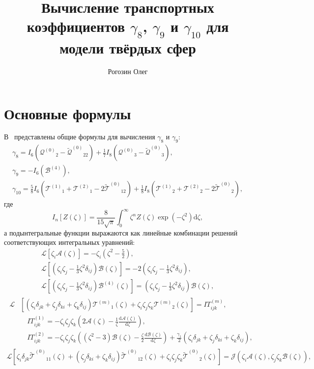 \documentclass[a4paper,12pt]{article}
\title{Вычисление транспортных коэффициентов \(\gamma_8\), \(\gamma_9\) и \(\gamma_{10}\) для модели твёрдых сфер}
\author{Рогозин Олег}
\newcommand{\dd}{\mathrm{d}}
\newcommand{\der}[2][]{\frac{\dd#1}{\dd#2}}
\newcommand{\B}{\ensuremath{\mathcal{B}^{(4)}}}
\newcommand{\Q}{\ensuremath{\mathcal{Q}^{(0)}}}
\newcommand{\T}[1]{\ensuremath{\mathcal{T}^{(#1)}}}
\newcommand{\TT}{\ensuremath{\tilde{\mathcal{T}}^{(0)}}}
\newcommand{\QQ}{\ensuremath{\tilde{\mathcal{Q}}^{(0)}}}
\newcommand{\ZD}[2]{\zeta_{#1}\delta_{#2}}
\newcommand{\ZZZ}{\zeta_i\zeta_j\zeta_k}
\begin{document}
\maketitle
\tableofcontents

\section{Основные формулы}

В~\cite{Sone2000, Sone2002} представлены общие формулы для вычисления \(\gamma_8\) и \(\gamma_9\):
\begin{gather}
    \gamma_8 = I_6\left(\Q_2 - \QQ_{22}\right) + \frac17 I_8\left(\Q_3 - \QQ_3\right), \label{eq:gamma_8}\\
    \gamma_9 = -I_6\left(\B\right), \label{eq:gamma_9}\\
    \gamma_{10} = \frac58 I_6\left(\T{1}_1 + \T{2}_1 - 2\TT_{12}\right)
        + \frac18 I_8\left(\T{1}_2 + \T{2}_2 - 2\TT_2\right), \label{eq:gamma_10}
\end{gather}
где
\begin{equation}\label{eq:I_n}
    I_n[Z(\zeta)] = \frac{8}{15\sqrt\pi} \int_0^\infty \zeta^n Z(\zeta) \exp(-\zeta^2) \dd\zeta,
\end{equation}
а подынтегральные функции выражаются как линейные комбинации решений соответствующих интегральных уравнений:
\begin{gather}
    \mathcal{L}\left[\zeta_i\mathcal{A}(\zeta)\right] = -\zeta_i\left(\zeta^2-\frac52\right), \label{eq:A}\\[6pt]
    \mathcal{L}\left[\left(\zeta_i\zeta_j-\frac13\zeta^2\delta_{ij}\right)\mathcal{B}(\zeta)\right] =
        -2\left(\zeta_i\zeta_j-\frac13\zeta^2\delta_{ij}\right), \label{eq:B}\\[6pt]
    \mathcal{L}\left[\left(\zeta_i\zeta_j-\frac13\zeta^2\delta_{ij}\right)\B(\zeta)\right] =
        \left(\zeta_i\zeta_j-\frac13\zeta^2\delta_{ij}\right)\mathcal{B}(\zeta), \label{eq:B_4}
\end{gather}
\begin{gather}
    \begin{aligned}
    \mathcal{L}&\left[(\ZD{i}{jk}+\ZD{j}{ki}+\ZD{k}{ij})\T{m}_1(\zeta) + \ZZZ\T{m}_2(\zeta)\right] = IT^{(m)}_{ijk}, \\
        &\quad IT^{(1)}_{ijk} = -\ZZZ\left( 2\mathcal{A}(\zeta) - \frac1\zeta \der[\mathcal{A}(\zeta)]{\zeta} \right), \\
        &\quad IT^{(2)}_{ijk} = -\ZZZ\left( (\zeta^2-3)\mathcal{B}(\zeta) - \frac\zeta2 \der[\mathcal{B}(\zeta)]{\zeta} \right)
        + \frac{\gamma_1}{2} (\ZD{i}{jk}+\ZD{j}{ki}+\ZD{k}{ij}),
    \end{aligned}\label{eq:T}\\
    \mathcal{L}\left[\ZD{i}{jk}\TT_{11}(\zeta)+(\ZD{j}{ki}+\ZD{k}{ij})\TT_{12}(\zeta) + \ZZZ\TT_2(\zeta)\right]
        = \mathcal{J}(\zeta_i\mathcal{A}(\zeta), \zeta_j\zeta_k\mathcal{B}(\zeta)), \label{eq:TT}
\end{gather}
\end{document}

